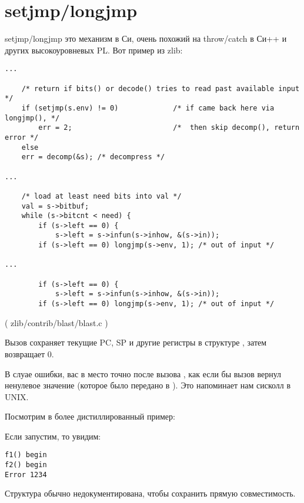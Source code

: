 \section{setjmp/longjmp}


setjmp/longjmp это механизм в Си, очень похожий на throw/catch в Си++ и других высокоуровневых \ac{PL}.
Вот пример из zlib:

\begin{lstlisting}[style=customc]
...

    /* return if bits() or decode() tries to read past available input */
    if (setjmp(s.env) != 0)             /* if came back here via longjmp(), */
        err = 2;                        /*  then skip decomp(), return error */
    else
	err = decomp(&s); /* decompress */

...

    /* load at least need bits into val */
    val = s->bitbuf;
    while (s->bitcnt < need) {
        if (s->left == 0) {
            s->left = s->infun(s->inhow, &(s->in));
	    if (s->left == 0) longjmp(s->env, 1); /* out of input */

...

        if (s->left == 0) {
            s->left = s->infun(s->inhow, &(s->in));
	    if (s->left == 0) longjmp(s->env, 1); /* out of input */
\end{lstlisting}
( zlib/contrib/blast/blast.c )

Вызов  сохраняет текущие \ac{PC}, \ac{SP} и другие регистры в структуре , затем возвращает 0.

В слуае ошибки,   вас в место точно после вызова ,
как если бы вызов  вернул ненулевое значение (которое было передано в ).
Это напоминает нам сисколл  в UNIX.

Посмотрим в более дистиллированный пример:



Если запустим, то увидим:

\begin{lstlisting}
f1() begin
f2() begin
Error 1234
\end{lstlisting}

Структура  обычно недокументирована, чтобы сохранить прямую совместимость.

